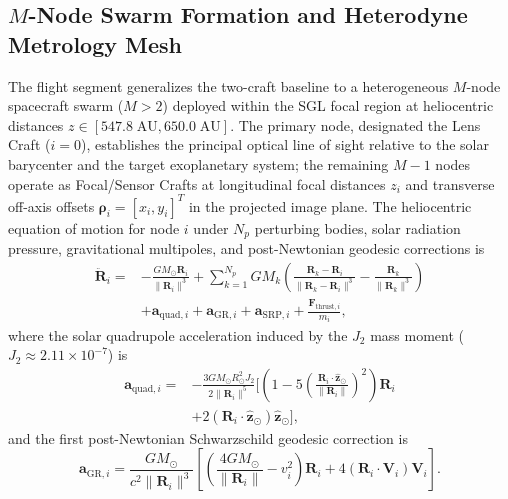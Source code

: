 \documentclass[10pt,twocolumn]{IEEEtran}
\begin{document}
\subsection{$M$-Node Swarm Formation and Heterodyne Metrology Mesh}
\label{sec:swarm_formation}

The flight segment generalizes the two-craft baseline to a
heterogeneous $M$-node spacecraft swarm ($M>2$) deployed within the SGL
focal region at heliocentric distances
$z\in[547.8\;\mathrm{AU},650.0\;\mathrm{AU}]$. The primary node, designated
the Lens Craft ($i=0$), establishes the principal optical line of sight
relative to the solar barycenter and the target exoplanetary system; the
remaining $M-1$ nodes operate as Focal/Sensor Crafts at longitudinal
focal distances $z_i$ and transverse off-axis offsets
$\bm{\rho}_i=[x_i,y_i]^{T}$ in the projected image plane. The heliocentric
equation of motion for node $i$ under $N_p$ perturbing bodies, solar
radiation pressure, gravitational multipoles, and post-Newtonian geodesic
corrections is
\begin{equation}
\begin{aligned}
\ddot{\mathbf{R}}_i ={}& -\frac{G M_{\odot}\mathbf{R}_i}{\|\mathbf{R}_i\|^3}
+ \sum_{k=1}^{N_p} G M_k \left(
\frac{\mathbf{R}_k-\mathbf{R}_i}{\|\mathbf{R}_k-\mathbf{R}_i\|^3}
-\frac{\mathbf{R}_k}{\|\mathbf{R}_k\|^3}\right) \\
&+ \mathbf{a}_{\mathrm{quad},i}+\mathbf{a}_{\mathrm{GR},i}
+\mathbf{a}_{\mathrm{SRP},i}
+\frac{\mathbf{F}_{\mathrm{thrust},i}}{m_i},
\end{aligned}
\label{eq:heliocentric_eom}
\end{equation}
where the solar quadrupole acceleration induced by the $J_2$ mass moment
($J_2\approx2.11\times10^{-7}$) is
\begin{equation}
\begin{aligned}
\mathbf{a}_{\mathrm{quad},i} ={}&
-\frac{3GM_{\odot}R_{\odot}^{2}J_2}{2\|\mathbf{R}_i\|^5}
\Bigg[\left(1-5\left(\frac{\mathbf{R}_i\cdot\hat{\mathbf{z}}_{\odot}}
{\|\mathbf{R}_i\|}\right)^{2}\right)\mathbf{R}_i \\
&+2\left(\mathbf{R}_i\cdot\hat{\mathbf{z}}_{\odot}\right)
\hat{\mathbf{z}}_{\odot}\Bigg],
\end{aligned}
\label{eq:j2_quad}
\end{equation}
and the first post-Newtonian Schwarzschild geodesic correction is
\begin{equation}
\mathbf{a}_{\mathrm{GR},i}=\frac{GM_{\odot}}{c^{2}\|\mathbf{R}_i\|^{3}}
\left[\left(\frac{4GM_{\odot}}{\|\mathbf{R}_i\|}-v_i^{2}\right)\mathbf{R}_i
+4\left(\mathbf{R}_i\cdot\mathbf{V}_i\right)\mathbf{V}_i\right].
\label{eq:gr_correction}
\end{equation}
\end{document}
